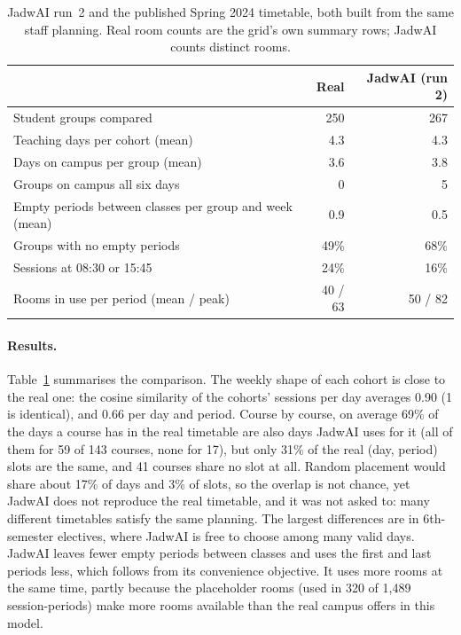\begin{table}[h]
\centering
\small
\begin{tabular}{@{}lrr@{}}
\toprule
 & Real & JadwAI (run 2) \\
\midrule
Student groups compared & 250 & 267 \\
Teaching days per cohort (mean) & 4.3 & 4.3 \\
Days on campus per group (mean) & 3.6 & 3.8 \\
Groups on campus all six days & 0 & 5 \\
Empty periods between classes per group and week (mean) & 0.9 & 0.5 \\
Groups with no empty periods & 49\% & 68\% \\
Sessions at 08:30 or 15:45 & 24\% & 16\% \\
Rooms in use per period (mean / peak) & 40 / 63 & 50 / 82 \\
\bottomrule
\end{tabular}
\caption{JadwAI run~2 and the published Spring 2024 timetable, both built from the same staff planning. Real room counts are the grid's own summary rows; JadwAI counts distinct rooms.}
\label{tab:real}
\end{table}

\paragraph{Results.} Table~\ref{tab:real} summarises the comparison. The weekly shape of each cohort is close to the real one: the cosine similarity of the cohorts' sessions per day averages 0.90 (1 is identical), and 0.66 per day and period. Course by course, on average 69\% of the days a course has in the real timetable are also days JadwAI uses for it (all of them for 59 of 143 courses, none for 17), but only 31\% of the real (day, period) slots are the same, and 41 courses share no slot at all. Random placement would share about 17\% of days and 3\% of slots, so the overlap is not chance, yet JadwAI does not reproduce the real timetable, and it was not asked to: many different timetables satisfy the same planning. The largest differences are in 6th-semester electives, where JadwAI is free to choose among many valid days. JadwAI leaves fewer empty periods between classes and uses the first and last periods less, which follows from its convenience objective. It uses more rooms at the same time, partly because the placeholder rooms (used in 320 of 1{,}489 session-periods) make more rooms available than the real campus offers in this model.

